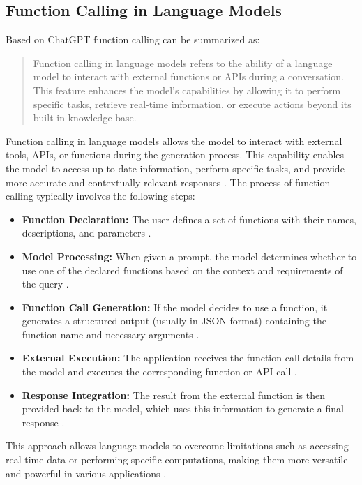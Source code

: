 \newpage
\subsection{Function Calling in Language Models}
Based on ChatGPT function calling can be summarized as:

\begin{quote}
Function calling in language models refers to the ability of a language model to interact with external functions or APIs during a conversation. This feature enhances the model's capabilities by allowing it to perform specific tasks, retrieve real-time information, or execute actions beyond its built-in knowledge base.
\end{quote} \cite{openai2024function-chatgpt}

\noindent
Function calling in language models allows the model to interact with external tools, APIs, or functions during the generation process. This capability enables the model to access up-to-date information, perform specific tasks, and provide more accurate and contextually relevant responses \cite{mistral2024function, openai2024function-article, google2024function}.
The process of function calling typically involves the following steps:

\begin{itemize}
\item \textbf{Function Declaration:} The user defines a set of functions with their names, descriptions, and parameters \cite{mistral2024function}.

\item \textbf{Model Processing:} When given a prompt, the model determines whether to use one of the declared functions based on the context and requirements of the query \cite{mistral2024function, openai2024function-article}.

\item \textbf{Function Call Generation:} If the model decides to use a function, it generates a structured output (usually in JSON format) containing the function name and necessary arguments \cite{mistral2024function, openai2024function-article}.

\item \textbf{External Execution:} The application receives the function call details from the model and executes the corresponding function or API call \cite{mistral2024function, google2024function}.

\item \textbf{Response Integration:} The result from the external function is then provided back to the model, which uses this information to generate a final response \cite{mistral2024function, google2024function}.
\end{itemize}
This approach allows language models to overcome limitations such as accessing real-time data or performing specific computations, making them more versatile and powerful in various applications \cite{google2024function}.

